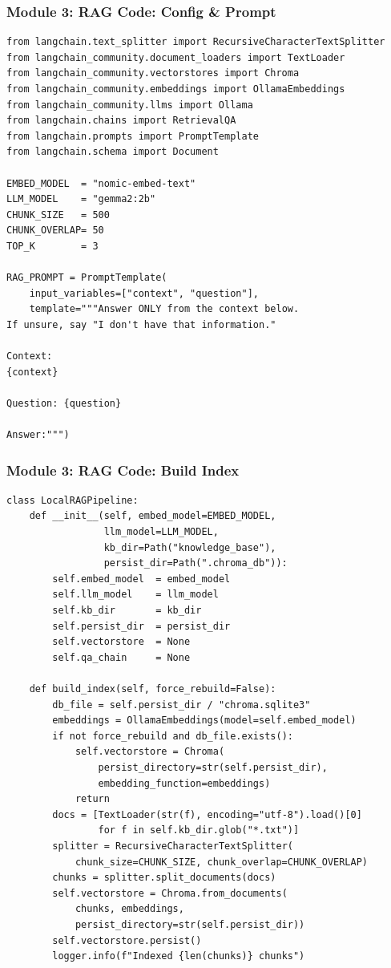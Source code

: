 \begin{frame}[fragile]\frametitle{Module 3: RAG Code: Config \& Prompt}
\begin{lstlisting}
from langchain.text_splitter import RecursiveCharacterTextSplitter
from langchain_community.document_loaders import TextLoader
from langchain_community.vectorstores import Chroma
from langchain_community.embeddings import OllamaEmbeddings
from langchain_community.llms import Ollama
from langchain.chains import RetrievalQA
from langchain.prompts import PromptTemplate
from langchain.schema import Document

EMBED_MODEL  = "nomic-embed-text"
LLM_MODEL    = "gemma2:2b"
CHUNK_SIZE   = 500
CHUNK_OVERLAP= 50
TOP_K        = 3

RAG_PROMPT = PromptTemplate(
    input_variables=["context", "question"],
    template="""Answer ONLY from the context below.
If unsure, say "I don't have that information."

Context:
{context}

Question: {question}

Answer:""")
\end{lstlisting}
\end{frame}

\begin{frame}[fragile]\frametitle{Module 3: RAG Code: Build Index}
\begin{lstlisting}
class LocalRAGPipeline:
    def __init__(self, embed_model=EMBED_MODEL,
                 llm_model=LLM_MODEL,
                 kb_dir=Path("knowledge_base"),
                 persist_dir=Path(".chroma_db")):
        self.embed_model  = embed_model
        self.llm_model    = llm_model
        self.kb_dir       = kb_dir
        self.persist_dir  = persist_dir
        self.vectorstore  = None
        self.qa_chain     = None

    def build_index(self, force_rebuild=False):
        db_file = self.persist_dir / "chroma.sqlite3"
        embeddings = OllamaEmbeddings(model=self.embed_model)
        if not force_rebuild and db_file.exists():
            self.vectorstore = Chroma(
                persist_directory=str(self.persist_dir),
                embedding_function=embeddings)
            return
        docs = [TextLoader(str(f), encoding="utf-8").load()[0]
                for f in self.kb_dir.glob("*.txt")]
        splitter = RecursiveCharacterTextSplitter(
            chunk_size=CHUNK_SIZE, chunk_overlap=CHUNK_OVERLAP)
        chunks = splitter.split_documents(docs)
        self.vectorstore = Chroma.from_documents(
            chunks, embeddings,
            persist_directory=str(self.persist_dir))
        self.vectorstore.persist()
        logger.info(f"Indexed {len(chunks)} chunks")
\end{lstlisting}
\end{frame}

